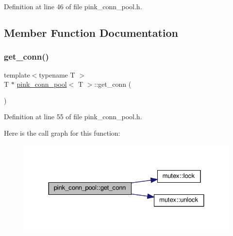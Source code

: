 Definition at line 46 of file pink\+\_\+conn\+\_\+pool.\+h.



\subsection{Member Function Documentation}
\mbox{\label{classpink__conn__pool_a1b053641006c7f00fd4764fea40f410c}} 
\subsubsection{\texorpdfstring{get\+\_\+conn()}{get\_conn()}}
{\footnotesize\ttfamily template$<$typename T $>$ \\
T $\ast$ \hyperlink{classpink__conn__pool}{pink\+\_\+conn\+\_\+pool}$<$ T $>$\+::get\+\_\+conn (\begin{DoxyParamCaption}{ }\end{DoxyParamCaption})}



Definition at line 55 of file pink\+\_\+conn\+\_\+pool.\+h.

Here is the call graph for this function\+:
\nopagebreak
\begin{figure}[H]
\begin{center}
\leavevmode
\includegraphics[width=324pt]{classpink__conn__pool_a1b053641006c7f00fd4764fea40f410c_cgraph}
\end{center}
\end{figure}
\mbox{\label{classpink__conn__pool_a90965493d13fc28f0060ca6fed7d12a4}} 
